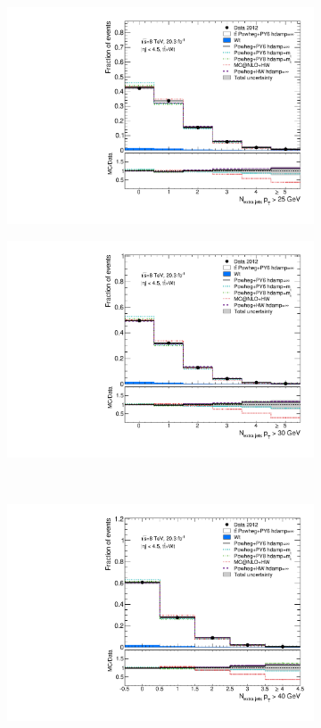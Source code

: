 \begin{figure}
\centering
\begin{subfigure}[]{0.45\textwidth}
\includegraphics[width=\textwidth]{fig/DataUnfold/NLO/NExtraJets25.pdf}
\end{subfigure}
\begin{subfigure}[]{0.45\textwidth}
\includegraphics[width=\textwidth]{fig/DataUnfold/NLO/NExtraJets30.pdf}
\end{subfigure}
\\
\begin{subfigure}[]{0.45\textwidth}
\includegraphics[width=\textwidth]{fig/DataUnfold/NLO/NExtraJets40.pdf}

\end{subfigure}
\end{figure}
